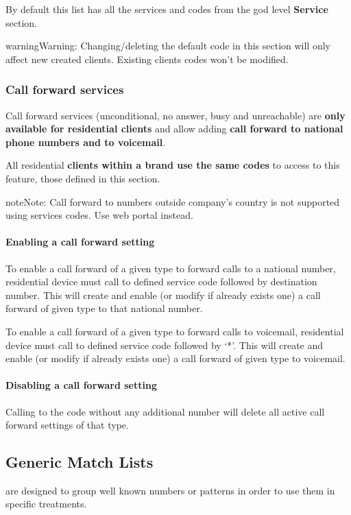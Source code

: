 \documentclass[letterpaper,10pt,english]{sphinxmanual}
\begin{document}
By default this list has all the services and codes from the god level \textbf{Service} section.

\begin{notice}{warning}{Warning:}
Changing/deleting the default code in this section will only affect new created clients. Existing clients codes won't
be modified.
\end{notice}


\subsubsection{Call forward services}
\label{administration_portal/brand/settings/generic_services:call-forward-services}
Call forward services (unconditional, no answer, busy and unreachable) are \textbf{only available for residential clients}
and allow adding \textbf{call forward to national phone numbers and to voicemail}.

All residential \textbf{clients within a brand use the same codes} to access to this feature, those defined in this section.

\begin{notice}{note}{Note:}
Call forward to numbers outside company's country is not supported using services codes.
Use web portal instead.
\end{notice}
\paragraph{Enabling a call forward setting}

To enable a call forward of a given type to forward calls to a national number, residential device must call to defined
service code followed by destination number. This will create and enable (or modify if already exists one) a call
forward of given type to that national number.

To enable a call forward of a given type to forward calls to voicemail, residential device must call to defined
service code followed by `*'. This will create and enable (or modify if already exists one) a call
forward of given type to voicemail.
\paragraph{Disabling a call forward setting}

Calling to the code without any additional number will delete all active call forward settings of that type.


\subsection{Generic Match Lists}
\label{administration_portal/brand/settings/generic_match_lists:generic-match-lists}\label{administration_portal/brand/settings/generic_match_lists::doc}\label{administration_portal/brand/settings/generic_match_lists:brand-match-lists}
{\hyperref[administration_portal/client/vpbx/routing_tools/match_lists:match\string-lists]{}} are designed to group well known numbers or patterns in order to use them in specific treatments.
\end{document}
